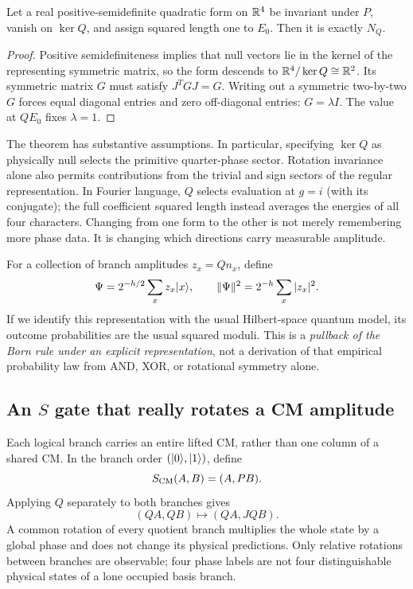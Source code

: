 \begin{proposition}
Let a real positive-semidefinite quadratic form on $\mathbb R^4$ be invariant under $P$, vanish on $\ker Q$, and assign squared length one to $E_0$. Then it is exactly $N_Q$.
\end{proposition}
\begin{proof}
Positive semidefiniteness implies that null vectors lie in the kernel of the representing symmetric matrix, so the form descends to $\mathbb R^4/\ker Q\cong\mathbb R^2$. Its symmetric matrix $G$ must satisfy $J^TGJ=G$. Writing out a symmetric two-by-two $G$ forces equal diagonal entries and zero off-diagonal entries: $G=\lambda I$. The value at $QE_0$ fixes $\lambda=1$.
\end{proof}
The theorem has substantive assumptions. In particular, specifying $\ker Q$ as physically null selects the primitive quarter-phase sector. Rotation invariance alone also permits contributions from the trivial and sign sectors of the regular representation. In Fourier language, $Q$ selects evaluation at $g=i$ (with its conjugate); the full coefficient squared length instead averages the energies of all four characters. Changing from one form to the other is not merely remembering more phase data. It is changing which directions carry measurable amplitude.

For a collection of branch amplitudes $z_x=Qn_x$, define
\begin{equation}\label{eq:stateC4}
 \Psi=2^{-h/2}\sum_x z_x\lvert x\rangle,\qquad
 \|\Psi\|^2=2^{-h}\sum_x|z_x|^2.
\end{equation}
If we identify this representation with the usual Hilbert-space quantum model, its outcome probabilities are the usual squared moduli. This is a \emph{pullback of the Born rule under an explicit representation}, not a derivation of that empirical probability law from AND, XOR, or rotational symmetry alone.

\subsection{An \texorpdfstring{$S$}{S} gate that really rotates a CM amplitude}
Each logical branch carries an entire lifted CM, rather than one column of a shared CM. In the branch order $(\lvert 0\rangle,\lvert 1\rangle)$, define
\begin{equation}
 S_{\rm CM}(A,B)=(A,PB).
\end{equation}
Applying $Q$ separately to both branches gives
\begin{equation}
 (QA,QB)\longmapsto(QA,JQB).
\end{equation}
A common rotation of every quotient branch multiplies the whole state by a global phase and does not change its physical predictions. Only relative rotations between branches are observable; four phase labels are not four distinguishable physical states of a lone occupied basis branch.

